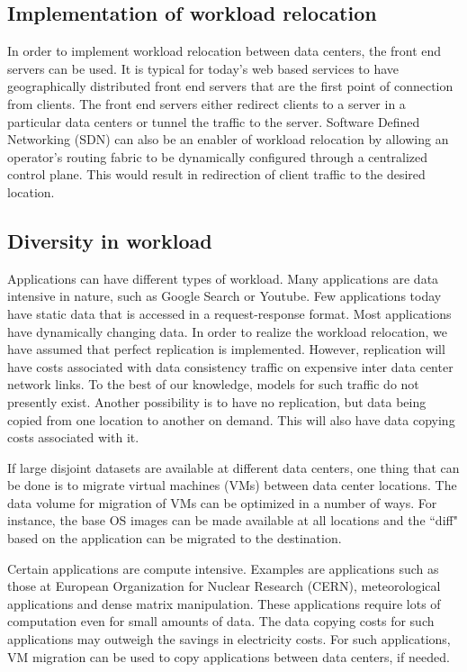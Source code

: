 \subsection{Implementation of workload relocation}
In order to implement workload relocation between data centers, the front end servers can be used. It is typical for today's web based services to have geographically distributed front end servers that are the first point of connection from clients. The front end servers either redirect clients to a server in a particular data centers or tunnel the traffic to the server. Software Defined Networking (SDN) can also be an enabler of workload relocation by allowing an operator's routing fabric to be dynamically configured through a centralized control plane. This would result in redirection of client traffic to the desired location.

\subsection{Diversity in workload}
Applications can have different types of workload. Many applications are data intensive in nature, such as Google Search or Youtube. Few applications today have static data that is accessed in a request-response format. Most applications have dynamically changing data. In order to realize the workload relocation, we have assumed that perfect replication is implemented. However, replication will have costs associated with data consistency traffic on expensive inter data center network links. To the best of our knowledge, models for such traffic do not presently exist. Another possibility is to have no replication, but data being copied from one location to another on demand. This will also have data copying costs associated with it. 

If large disjoint datasets are available at different data centers, one thing that can be done is to migrate virtual machines (VMs) between data center locations. The data volume for migration of VMs can be optimized in a number of ways. For instance, the base OS images can be made available at all locations and the ``diff" based on the application can be migrated to the destination. 

Certain applications are compute intensive. Examples are applications such as those at European Organization for Nuclear Research (CERN), meteorological applications and dense matrix manipulation. These applications require lots of computation even for small amounts of data. The data copying costs for such applications may outweigh the savings in electricity costs. For such applications, VM migration can be used to copy applications between data centers, if needed.

